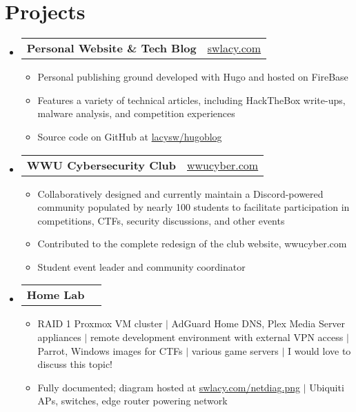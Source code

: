 \documentclass[10pt]{article}
\makeatletter
\newcommand{\resumeItem}[1]{
  \item\small{
    {#1 \vspace{-2pt}}
  }
}
\newcommand{\resumeProjectHeading}[2]{
    \item
    \begin{tabular*}{0.97\textwidth}{l@{\extracolsep{\fill}}r}
      \small#1 & #2 \\
    \end{tabular*}\vspace{-7pt}
}
\newcommand{\resumeSubHeadingListStart}{\begin{itemize}[leftmargin=0.15in, label={}]}
\newcommand{\resumeSubHeadingListEnd}{\end{itemize}}
\newcommand{\resumeItemListStart}{\begin{itemize}}
\newcommand{\resumeItemListEnd}{\end{itemize}\vspace{-5pt}}
\makeatother
\begin{document}
\section{Projects}
    \resumeSubHeadingListStart
      \resumeProjectHeading
          {\textbf{Personal Website \& Tech Blog}}{\href{https://swlacy.com}{swlacy.com}}
          \resumeItemListStart
            \resumeItem{Personal publishing ground developed with Hugo and hosted on FireBase}
            \resumeItem{Features a variety of technical articles, including HackTheBox write-ups, malware analysis, and competition experiences}
            \resumeItem{Source code on GitHub at \href{https://github.com/lacysw/hugoblog}{lacysw/hugoblog}}
          \resumeItemListEnd
      \resumeProjectHeading
          {\textbf{WWU Cybersecurity Club}}{\href{https://wwucyber.com}{wwucyber.com}}
          \resumeItemListStart
            \resumeItem{Collaboratively designed and currently maintain a Discord-powered community populated by nearly 100 students to facilitate participation in competitions, CTFs, security discussions, and other events}
            \resumeItem{Contributed to the complete redesign of the club website, wwucyber.com}
            \resumeItem{Student event leader and community coordinator}
          \resumeItemListEnd
      \resumeProjectHeading
          {\textbf{Home Lab}}{}
          \resumeItemListStart
            \resumeItem{RAID 1 Proxmox VM cluster $|$ AdGuard Home DNS, Plex Media Server appliances $|$ remote development environment with external VPN access $|$ Parrot, Windows images for CTFs $|$ various game servers $|$ I would love to discuss this topic!}
            \resumeItem{Fully documented; diagram hosted at \href{https://swlacy.com/netdiag.png}{swlacy.com/netdiag.png} $|$ Ubiquiti APs, switches, edge router powering network}
          \resumeItemListEnd
    \resumeSubHeadingListEnd
\end{document}
